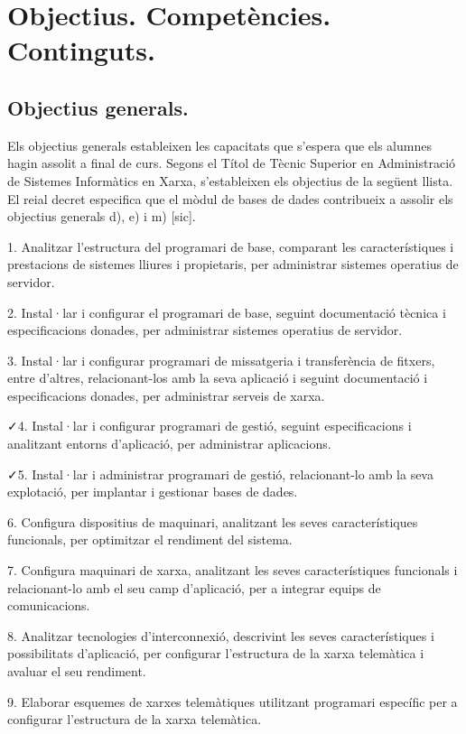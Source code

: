 \documentclass[catalan, a4paper, 12pt, titlepage]{article}
\begin{document}
\section{Objectius. Competències. Continguts.}
\label{sec:continguts}

\subsection{Objectius generals.}

Els objectius generals estableixen les capacitats que s'espera que els alumnes hagin assolit a final de curs. Segons el Títol de Tècnic Superior en Administració de Sistemes Informàtics en Xarxa, s'estableixen els objectius de la següent llista.
El reial decret especifica que el mòdul de bases de dades contribueix a assolir els objectius generals d), e) i m) [sic].

1. Analitzar l'estructura del programari de base, comparant les característiques i prestacions de sistemes lliures i propietaris, per administrar sistemes operatius de servidor.

2. Instal·lar i configurar el programari de base, seguint documentació tècnica i especificacions donades, per administrar sistemes operatius de servidor.

3. Instal·lar i configurar programari de missatgeria i transferència de fitxers, entre d'altres, relacionant-los amb la seva aplicació i seguint documentació i especificacions donades, per administrar serveis de xarxa.

\faCheck 4. Instal·lar i configurar programari de gestió, seguint especificacions i analitzant entorns d'aplicació, per administrar aplicacions.

\faCheck 5. Instal·lar i administrar programari de gestió, relacionant-lo amb la seva explotació, per implantar i gestionar bases de dades.

6. Configura dispositius de maquinari, analitzant les seves característiques funcionals, per optimitzar el rendiment del sistema.

7. Configura maquinari de xarxa, analitzant les seves característiques funcionals i relacionant-lo amb el seu camp d'aplicació, per a integrar equips de comunicacions.

8. Analitzar tecnologies d'interconnexió, descrivint les seves característiques i possibilitats d'aplicació, per configurar l'estructura de la xarxa telemàtica i avaluar el seu rendiment.

9. Elaborar esquemes de xarxes telemàtiques utilitzant programari específic per a configurar l'estructura de la xarxa telemàtica.
\end{document}
